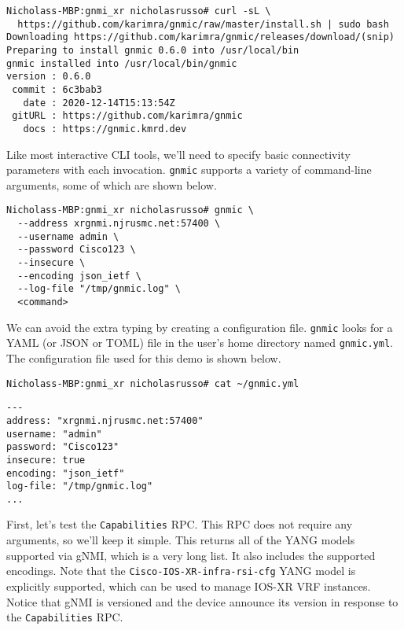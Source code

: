 \begin{verbatim}
Nicholass-MBP:gnmi_xr nicholasrusso# curl -sL \
  https://github.com/karimra/gnmic/raw/master/install.sh | sudo bash
Downloading https://github.com/karimra/gnmic/releases/download/(snip)
Preparing to install gnmic 0.6.0 into /usr/local/bin
gnmic installed into /usr/local/bin/gnmic
version : 0.6.0
 commit : 6c3bab3
   date : 2020-12-14T15:13:54Z
 gitURL : https://github.com/karimra/gnmic
   docs : https://gnmic.kmrd.dev
\end{verbatim}

Like most interactive CLI tools, we'll need to specify basic connectivity
parameters with each invocation. \verb|gnmic| supports a variety of
command-line arguments, some of which are shown below.

\begin{verbatim}
Nicholass-MBP:gnmi_xr nicholasrusso# gnmic \
  --address xrgnmi.njrusmc.net:57400 \
  --username admin \
  --password Cisco123 \
  --insecure \
  --encoding json_ietf \
  --log-file "/tmp/gnmic.log" \
  <command> 
\end{verbatim}

We can avoid the extra typing by creating a configuration file. \verb|gnmic|
looks for a YAML (or JSON or TOML) file in the user's home directory named
\verb|gnmic.yml|. The configuration file used for this demo is shown below.

\begin{verbatim}
Nicholass-MBP:gnmi_xr nicholasrusso# cat ~/gnmic.yml
\end{verbatim}

\begin{verbatim}
---
address: "xrgnmi.njrusmc.net:57400"
username: "admin"
password: "Cisco123"
insecure: true
encoding: "json_ietf"
log-file: "/tmp/gnmic.log"
...
\end{verbatim}


First, let's test the \verb|Capabilities| RPC\@. This RPC does not require any
arguments, so we'll keep it simple. This returns all of the YANG models
supported via gNMI, which is a very long list. It also includes the supported
encodings. Note that the \verb|Cisco-IOS-XR-infra-rsi-cfg| YANG model
is explicitly supported, which can be used to manage IOS-XR VRF instances.
Notice that gNMI is versioned and the device announce its version in
response to the \verb|Capabilities| RPC\@.

